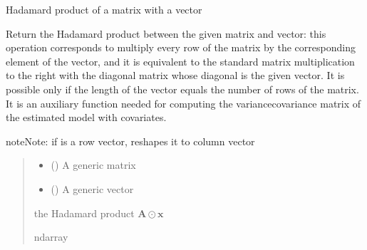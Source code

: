 \documentclass[letterpaper,10pt,english]{sphinxmanual}
\begin{document}
\begin{fulllineitems}
\label{\detokenize{cubmods:cubmods.general.hadprod}}
\pysigstartsignatures
{}
\pysigstopsignatures
\sphinxAtStartPar
Hadamard product of a matrix with a vector

\sphinxAtStartPar
Return the Hadamard product between the given matrix and vector: this operation corresponds 
to multiply every row of the matrix by the corresponding element of the vector, and it is equivalent to the 
standard matrix multiplication to the right with the diagonal matrix whose diagonal is the given vector. 
It is possible only if the length of the vector equals the number of rows of the matrix.
It is an auxiliary function needed for computing the variance\sphinxhyphen{}covariance matrix of the estimated model 
with covariates.

\begin{sphinxadmonition}{note}{Note:}
\sphinxAtStartPar
if  is a row vector, reshapes it to column vector
\end{sphinxadmonition}
\begin{quote}\begin{description}
\begin{itemize}
\item {} 
\sphinxAtStartPar
{} () \textendash{} A generic matrix

\item {} 
\sphinxAtStartPar
{} () \textendash{} A generic vector

\end{itemize}

\sphinxAtStartPar
the Hadamard product \(\pmb A \odot \pmb x\)

\sphinxAtStartPar
ndarray

\end{description}\end{quote}

\end{fulllineitems}

\end{document}
